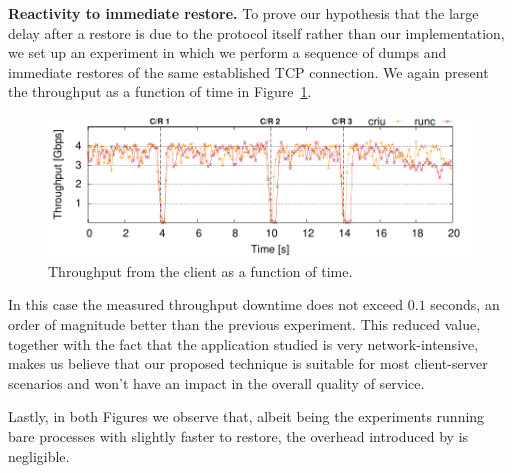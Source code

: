 \textbf{Reactivity to immediate restore.}
To prove our hypothesis that the large delay after a restore is due to the protocol itself rather than our implementation, we set up an experiment in which we perform a sequence of dumps and immediate restores of the same established TCP connection.
We again present the throughput as a function of time in Figure~\ref{fig:evaluation-reactivity}.
\begin{figure}[h!]
    \centering
    \includegraphics[width=\linewidth]{./images/tcp_established_resolution_microbenchmark.pdf}
    \caption{Throughput from the client as a function of time.\label{fig:evaluation-reactivity}}
\end{figure}
In this case the measured throughput downtime does not exceed $0.1$ seconds, an order of magnitude better than the previous experiment.
This reduced value, together with the fact that the application studied is very network-intensive, makes us believe that our proposed technique is suitable for most client-server scenarios and won't have an impact in the overall quality of service.

Lastly, in both Figures we observe that, albeit being the experiments running bare processes with \criu slightly faster to restore, the overhead introduced by \runc is negligible.
